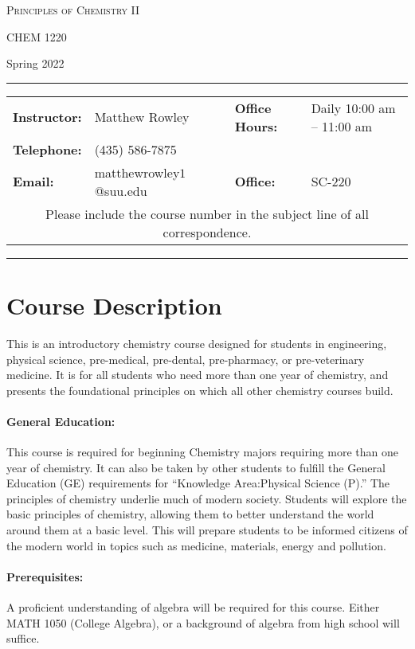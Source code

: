 \documentclass[12pt, letterpaper]{article}
\begin{document}
\begin{center}
{\Large \textsc{Principles of Chemistry II}}

CHEM 1220
\end{center}
\begin{center}
{\large Spring 2022}
\end{center}
\begin{center}
	\rule{0.99\textwidth}{0.4pt}
	\begin{tabular}{llcll}
		\textbf{Instructor:} & Matthew Rowley & & \textbf{Office Hours:} & Daily 10:00 am -- 11:00 am \\
		\textbf{Telephone:} & (435) 586-7875 & & & \\
		\textbf{Email:} & matthewrowley$1$@suu.edu  & & \textbf{Office:} & SC-220\\
		\multicolumn{5}{c}{Please include the course number in the subject line of all correspondence.} 
	\end{tabular}
	\rule{0.99\textwidth}{0.4pt}
\end{center}

\section*{Course Description} 
This is an introductory chemistry course designed for students in engineering, physical science, pre-medical, pre-dental, pre-pharmacy, or pre-veterinary medicine. It is for all students who need more than one year of chemistry, and presents the foundational principles on which all other chemistry courses build.

\paragraph{General Education:}
This course is required for beginning Chemistry majors requiring more than one year of chemistry. It can also be taken by other students to fulfill the General Education (GE) requirements for ``Knowledge Area:Physical Science (P).'' The principles of chemistry underlie much of modern society. Students will explore the basic principles of chemistry, allowing them to better understand the world around them at a basic level. This will prepare students to be informed citizens of the modern world in topics such as medicine, materials, energy and pollution.

\paragraph{Prerequisites:}
A proficient understanding of algebra will be required for this course. Either MATH 1050 (College Algebra), or a background of algebra from high school will suffice.
\end{document}
